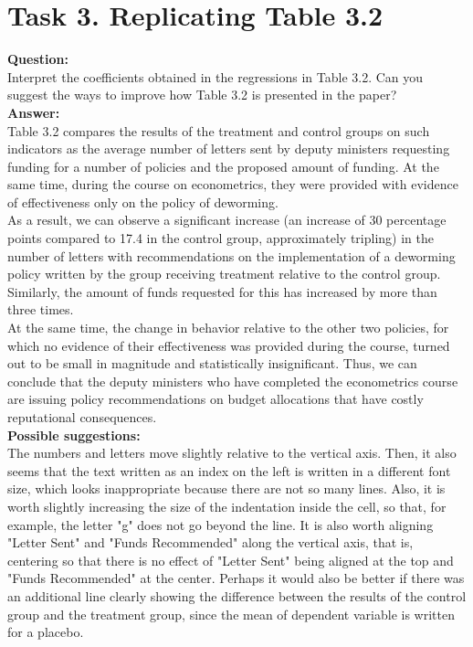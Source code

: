 \documentclass[12pt, a4paper]{article}
\begin{document}
	\section*{Task 3. Replicating Table 3.2}
	\textbf{Question:}\\
	Interpret the coefficients obtained in the regressions in Table 3.2. Can you suggest the ways to improve how Table 3.2 is presented in the paper?\\
	\textbf{Answer:}\\
	Table 3.2 compares the results of the treatment and control groups on such indicators as the average number of letters sent by deputy ministers requesting funding for a number of policies and the proposed amount of funding. At the same time, during the course on econometrics, they were provided with evidence of effectiveness only on the policy of deworming. \\
	As a result, we can observe a significant increase (an increase of 30 percentage points compared to 17.4 in the control group, approximately tripling) in the number of letters with recommendations on the implementation of a deworming policy written by the group receiving treatment relative to the control group. \\
	Similarly, the amount of funds requested for this has increased by more than three times. \\
	At the same time, the change in behavior relative to the other two policies, for which no evidence of their effectiveness was provided during the course, turned out to be small in magnitude and statistically insignificant. Thus, we can conclude that the deputy ministers who have completed the econometrics course are issuing policy recommendations on budget allocations that have costly reputational consequences. \\
	\textbf{Possible suggestions:}\\
	The numbers and letters move slightly relative to the vertical axis. Then, it also seems that the text written as an index on the left is written in a different font size, which looks inappropriate because there are not so many lines. Also, it is worth slightly increasing the size of the indentation inside the cell, so that, for example, the letter "g" does not go beyond the line. It is also worth aligning "Letter Sent" and "Funds Recommended" along the vertical axis, that is, centering so that there is no effect of "Letter Sent" being aligned at the top and "Funds Recommended" at the center.
	Perhaps it would also be better if there was an additional line clearly showing the difference between the results of the control group and the treatment group, since the mean of dependent variable is written for a placebo.
\end{document}
